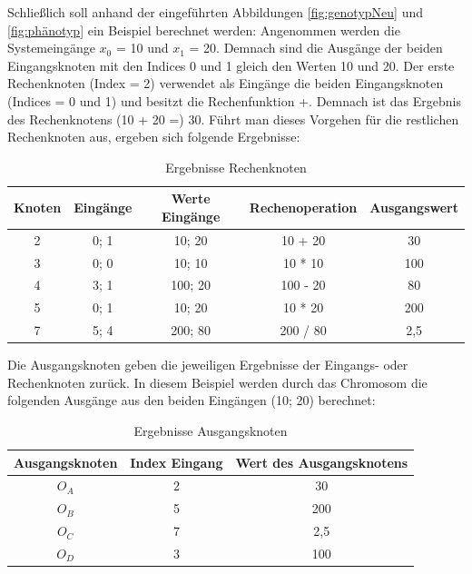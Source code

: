 Schließlich soll anhand der eingeführten Abbildungen \ref{fig:genotypNeu} und \ref{fig:phänotyp} ein Beispiel berechnet werden:\newline
Angenommen werden die Systemeingänge $x_0$ = 10 und $x_1$ = 20.
Demnach sind die Ausgänge der beiden Eingangsknoten mit den Indices 0 und 1 gleich den Werten 10 und 20.
Der erste Rechenknoten (Index = 2) verwendet als Eingänge die beiden Eingangsknoten (Indices = 0 und 1) und besitzt die Rechenfunktion +.
Demnach ist das Ergebnis des Rechenknotens (10 + 20 =) 30.
Führt man dieses Vorgehen für die restlichen Rechenknoten aus, ergeben sich folgende Ergebnisse:

\begin{table}[h]
    \centering
    \begin{tabular}{c|c|c|c|c}
       \textbf{Knoten} & \textbf{Eingänge} & \textbf{Werte Eingänge} & \textbf{Rechenoperation} & \textbf{Ausgangswert} \\ \hline
        2 & 0; 1 & 10; 20 & 10 + 20 & 30 \\ \hline
        3 & 0; 0 & 10; 10 & 10 * 10 & 100 \\ \hline
        4 & 3; 1 & 100; 20 & 100 - 20 & 80 \\ \hline
        5 & 0; 1 & 10; 20 & 10 * 20 & 200 \\ \hline
        7 & 5; 4 & 200; 80 & 200 / 80 & 2,5
    \end{tabular}
    \caption{Ergebnisse Rechenknoten}
    \label{table:ergebnisseRechenknoten}
\end{table}

Die Ausgangsknoten geben die jeweiligen Ergebnisse der Eingangs- oder Rechenknoten zurück.
In diesem Beispiel werden durch das Chromosom die folgenden Ausgänge aus den beiden Eingängen (10; 20) berechnet:

\begin{table}[h]
    \centering
    \begin{tabular}{c|c|c}
       \textbf{Ausgangsknoten} & \textbf{Index Eingang} & \textbf{Wert des Ausgangsknotens} \\ \hline
        $O_A$ & 2 & 30 \\ \hline
        $O_B$ & 5 & 200 \\ \hline
        $O_C$ & 7 & 2,5 \\ \hline
        $O_D$ & 3 & 100
    \end{tabular}
    \caption{Ergebnisse Ausgangsknoten}
    \label{table:ergebnisseAusgangsknoten}
\end{table}

